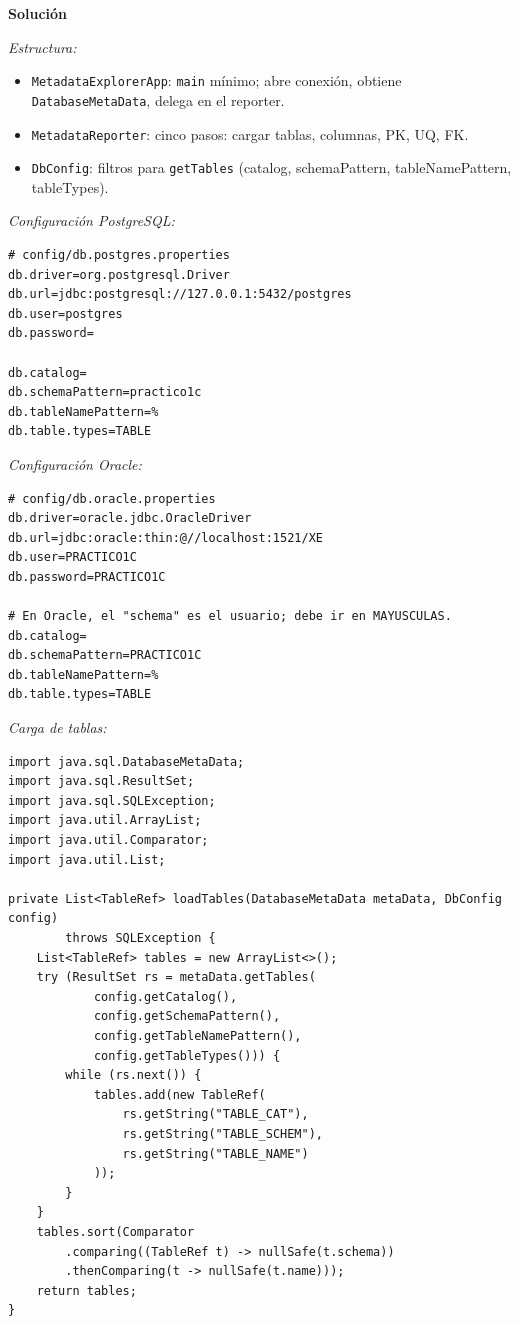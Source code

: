 \documentclass[11pt,a4paper]{article}
\newcommand{\itemcabecera}[1]{\noindent\textbf{#1}\par\medskip}
\newcommand{\bloqueSolucion}{\itemcabecera{Soluci\'on}}
\begin{document}
\bloqueSolucion

\textit{Estructura:}

\begin{itemize}
    \item \texttt{MetadataExplorerApp}: \texttt{main} mínimo; abre conexión, obtiene \texttt{DatabaseMetaData}, delega en el reporter.
    \item \texttt{MetadataReporter}: cinco pasos: cargar tablas, columnas, PK, UQ, FK.
    \item \texttt{DbConfig}: filtros para \texttt{getTables} (catalog, schemaPattern, tableNamePattern, tableTypes).
\end{itemize}

\textit{Configuración PostgreSQL:}

\begin{lstlisting}[style=propsstyle]
# config/db.postgres.properties
db.driver=org.postgresql.Driver
db.url=jdbc:postgresql://127.0.0.1:5432/postgres
db.user=postgres
db.password=

db.catalog=
db.schemaPattern=practico1c
db.tableNamePattern=%
db.table.types=TABLE
\end{lstlisting}

\textit{Configuración Oracle:}

\begin{lstlisting}[style=propsstyle]
# config/db.oracle.properties
db.driver=oracle.jdbc.OracleDriver
db.url=jdbc:oracle:thin:@//localhost:1521/XE
db.user=PRACTICO1C
db.password=PRACTICO1C

# En Oracle, el "schema" es el usuario; debe ir en MAYUSCULAS.
db.catalog=
db.schemaPattern=PRACTICO1C
db.tableNamePattern=%
db.table.types=TABLE
\end{lstlisting}

\textit{Carga de tablas:}

\begin{lstlisting}
import java.sql.DatabaseMetaData;
import java.sql.ResultSet;
import java.sql.SQLException;
import java.util.ArrayList;
import java.util.Comparator;
import java.util.List;

private List<TableRef> loadTables(DatabaseMetaData metaData, DbConfig config)
        throws SQLException {
    List<TableRef> tables = new ArrayList<>();
    try (ResultSet rs = metaData.getTables(
            config.getCatalog(),
            config.getSchemaPattern(),
            config.getTableNamePattern(),
            config.getTableTypes())) {
        while (rs.next()) {
            tables.add(new TableRef(
                rs.getString("TABLE_CAT"),
                rs.getString("TABLE_SCHEM"),
                rs.getString("TABLE_NAME")
            ));
        }
    }
    tables.sort(Comparator
        .comparing((TableRef t) -> nullSafe(t.schema))
        .thenComparing(t -> nullSafe(t.name)));
    return tables;
}
\end{lstlisting}
\end{document}
